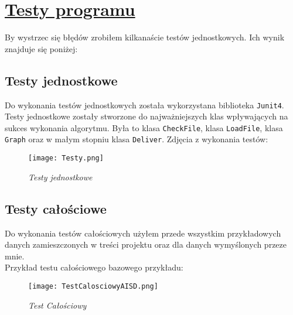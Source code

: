 \documentclass{article}
\begin{document}
\section{\underline{Testy programu}}
\indent By wystrzec się błędów zrobiłem kilkanaście testów jednostkowych. Ich wynik znajduje się poniżej:
\subsection{Testy jednostkowe}
\indent Do wykonania testów jednostkowych została wykorzystana biblioteka \verb|Junit4|. Testy jednostkowe zostały stworzone do najważniejszych klas wpływających na sukces wykonania algorytmu. Była to klasa \verb|CheckFile|, klasa \verb|LoadFile|,  klasa \verb|Graph| oraz w małym stopniu klasa \verb|Deliver|.
Zdjęcia z wykonania testów:\\
\vspace{1cm}
\begin{figure}[h]
		\hspace*{2.7cm} 
			\texttt{[image: Testy.png]}
				\caption[Testy jednostkowe] {{\sl Testy jednostkowe}}
				
		\end{figure}
\newpage

\subsection{Testy całościowe}
\indent Do wykonania testów całościowych użyłem przede wszystkim przykładowych danych zamieszczonych w treści projektu oraz dla danych wymyślonych przeze mnie.\\
 Przykład testu całościowego bazowego przykładu:
\vspace{1cm}
\begin{figure}[h]
\hspace*{-1.5cm} 
\texttt{[image: TestCalosciowyAISD.png]}
\caption[Test Całościowy] {{\sl Test Całościowy}}
\end{figure}
\end{document}
